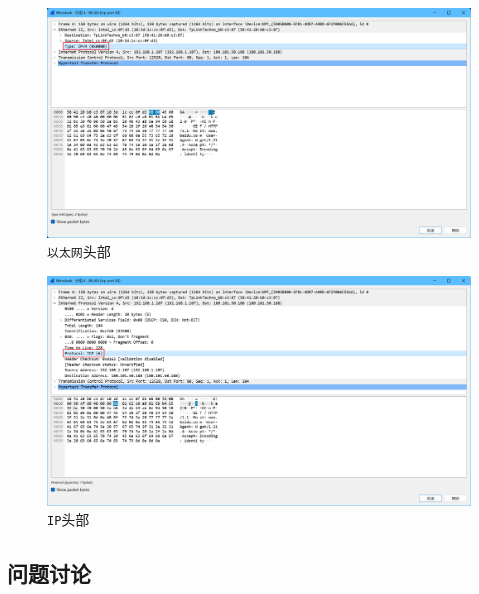 \documentclass{article}
\begin{document}
\begin{figure}[H]
  \centering
  \includegraphics[width=13cm]{images/12.png}
  \caption{\texttt{以太网}头部}
\end{figure}

\begin{figure}[H]
  \centering
  \includegraphics[width=13cm]{images/13.png}
  \caption{\texttt{IP}头部}
\end{figure}

\subsection{问题讨论}
\end{document}
